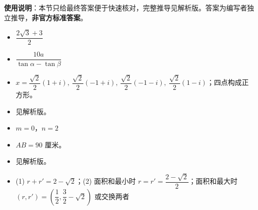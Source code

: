 
\begin{gknotice}
\textbf{使用说明}：本节只给最终答案便于快速核对，完整推导见解析版。答案为编写者独立推导，\textbf{非官方标准答案}。
\end{gknotice}

\begin{itemize}[leftmargin=2.6em]
  \item[\textbf{1.}] $\dfrac{2\sqrt3+3}{2}$
  \item[\textbf{2.}] $\dfrac{10a}{\tan\alpha-\tan\beta}$
  \item[\textbf{3.}] $x=\dfrac{\sqrt2}{2}(1+i),\ \dfrac{\sqrt2}{2}(-1+i),\ \dfrac{\sqrt2}{2}(-1-i),\ \dfrac{\sqrt2}{2}(1-i)$；四点构成正方形。
  \item[\textbf{4.}] 见解析版。
\end{itemize}

\begin{itemize}[leftmargin=2.6em]
  \item[\textbf{5.}] $m=0\text{，}n=2$
  \item[\textbf{6.}] $AB=90$ 厘米。
  \item[\textbf{7.}] 见解析版。
  \item[\textbf{8.}] (1) $r+r'=2-\sqrt2$；(2) 面积和最小时 $r=r'=\dfrac{2-\sqrt2}{2}$；面积和最大时 $(r,r')=\left(\dfrac12,\dfrac32-\sqrt2\right)$ 或交换两者
\end{itemize}
